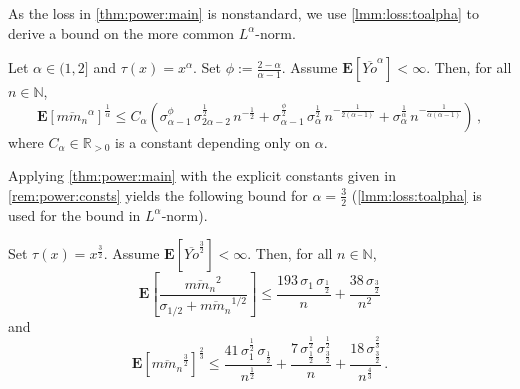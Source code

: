 \documentclass{article}
\newcommand{\N}{\mathbb{N}}
\newcommand{\R}{\mathbb{R}}
\newcommand{\Rpp}{\R_{>0}}
\newcommand{\lab}{\left[} %
\newcommand{\rab}{\right]} %
\newcommand{\ab}[1]{\lab #1 \rab} %
\newcommand{\abOf}[1]{\!\ab{#1}} %
\newcommand{\lb}{\left(} %
\newcommand{\rb}{\right)} %
\newcommand{\br}[1]{\lb #1 \rb} %
\newcommand{\E}{\mathbf{E}} %
\newcommand{\Eof}[1]{\E[#1]}
\newcommand{\EOf}[1]{\E\abOf{#1}}
\newcommand{\eqcm}{\,,} %
\newcommand{\eqfs}{\,.}
\newcommand{\ol}[2]{\overline{#1#2}}
\newcommand{\tran}{\tau}
\begin{document}
%
As the loss in \cref{thm:power:main} is nonstandard, we use \cref{lmm:loss:toalpha} to derive a bound on the more common $L^\alpha$-norm.
%
\begin{corollary}\label{cor:power:stdloss:sharp}
    Let $\alpha \in (1,2]$ and $\tran(x)=x^\alpha$. Set $\phi := \frac{2-\alpha}{\alpha-1}$.
    Assume $\Eof{\ol{Y}o^\alpha}<\infty$.
    Then, for all $n\in\N$,
    \begin{equation}\label{eq:power:stdloss:sharp}
        \EOf{\ol{m}{m_n}^\alpha}^{\frac1\alpha}
        \leq
        C_\alpha \br{
            \sigma_{\alpha-1}^{\phi}\, \sigma_{2\alpha-2}^{\frac12}\, n^{-\frac12}
            +
            \sigma_{\alpha-1}^{\frac\phi2}\, \sigma_{\alpha}^{\frac12}\, n^{-\frac{1}{2(\alpha-1)}}
            +
            \sigma_\alpha^{\frac1\alpha}\, n^{-\frac{1}{\alpha(\alpha-1)}}
        }
        \eqcm
    \end{equation}
    where $C_\alpha\in\Rpp$ is a constant depending only on $\alpha$.
\end{corollary}
%
Applying \cref{thm:power:main} with the explicit constants given in \cref{rem:power:consts} yields the following bound for $\alpha = \frac32$ (\cref{lmm:loss:toalpha} is used for the bound in $L^\alpha$-norm).
%
\begin{corollary}\label{cor:power:threehalfs}
    Set $\tran(x) = x^{\frac32}$.
    Assume $\Eof{\ol Yo^{\frac32}}<\infty$. Then, for all $n\in\N$,
    \begin{equation}
        \EOf{\frac{\ol{m}{m_n}^2}{\sigma_{1/2} + \ol{m}{m_n}^{1/2}}}
        \leq
        \frac{193\, \sigma_1\, \sigma_{\frac12}}{n} + \frac{38\, \sigma_{\frac32}}{n^2}
    \end{equation}
    and
    \begin{equation}
        \EOf{\ol{m}{m_n}^{\frac32}}^{\frac23}
        \leq
        \frac{41\, \sigma_1^{\frac12}\, \sigma_{\frac12}}{n^{\frac12}} 
        + 
        \frac{7\, \sigma_{\frac12}^{\frac12}\, \sigma_{\frac32}^{\frac12}}{n} 
        + 
        \frac{18\, \sigma_{\frac32}^{\frac23}}{n^{\frac43}}
        \eqfs
    \end{equation}
\end{corollary}
\end{document}
